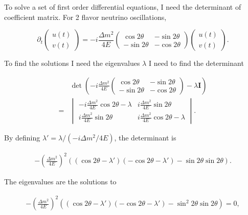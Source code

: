 \documentclass{tufte-handout}
\begin{document}
To solve a set of first order differential equations, I need the determinant of coefficient matrix. For 2 flavor neutrino oscillations,

\begin{equation*}
\partial_t \begin{pmatrix}
u(t) \\ v(t)
\end{pmatrix} = - i \frac{\Delta m^2}{4E} \begin{pmatrix}
\cos 2\theta &  -  \sin 2\theta \\  - \sin 2\theta & - \cos 2\theta
\end{pmatrix} \begin{pmatrix}
u(t) \\ v(t)
\end{pmatrix}.
\end{equation*}

To find the solutions I need the eigenvalues $\lambda$ I need to find the determinant

\begin{align*}
&\det \left( - i\frac{\Delta m^2}{4E} \begin{pmatrix}
\cos 2\theta &  -  \sin 2\theta \\  - \sin 2\theta & - \cos 2\theta
\end{pmatrix} - \lambda \mathbf{I} \right) \\
=& \begin{vmatrix}
-i \frac{\Delta m^2}{4E} \cos 2\theta - \lambda & i \frac{\Delta m^2}{4E} \sin 2\theta \\
i \frac{\Delta m^2}{4E} \sin 2\theta & i \frac{\Delta m^2}{4E} \cos 2\theta - \lambda
\end{vmatrix} .
\end{align*}

By defining $\lambda' = \lambda/(-i \Delta m^2 / 4E)$, the determinant is

\begin{align*}
- \left( \frac{\Delta m^2}{4E} \right)^2   ( (\cos 2\theta - \lambda')(-\cos 2\theta - \lambda') - \sin 2\theta \sin 2\theta ) .
\end{align*}

The eigenvalues are the solutions to

\begin{align*}
- \left( \frac{\Delta m^2}{4E} \right)^2   ( (\cos 2\theta - \lambda')(-\cos 2\theta - \lambda') - \sin^2 2\theta \sin 2\theta ) =0 ,
\end{align*}
\end{document}
